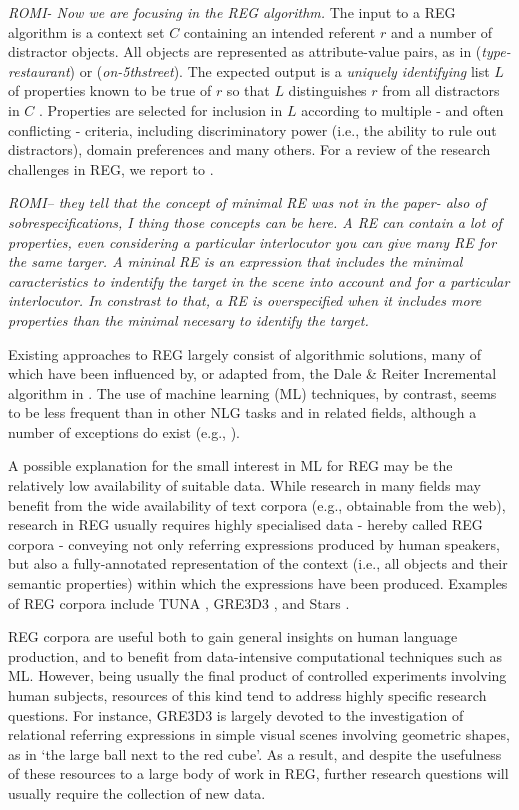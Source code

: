 \documentclass{article}
\begin{document}
{\it ROMI- Now we are focusing in the REG algorithm.} The input to a REG algorithm is a context set $C$ containing an intended referent $r$ and a number of distractor objects. All objects are represented as attribute-value pairs, as in ({\em type-restaurant}) or ({\em on-5thstreet}). The expected output is a {\em uniquely identifying} list $L$ of properties known to be true of $r$ so that $L$ distinguishes $r$ from all distractors in $C$ \cite{incremental}. Properties are selected for inclusion in $L$ according to multiple - and often conflicting - criteria, including discriminatory power (i.e., the ability to rule out distractors), domain preferences and many others. For a review of the research challenges in REG, we report to \cite{survey}.


{\it ROMI-- they tell that the concept of minimal RE was not in the paper- also of sobrespecifications, I thing those concepts can be here.
A RE can contain a lot of properties, even considering a particular interlocutor you can give many RE for the same targer. A mininal RE is an expression that includes the minimal caracteristics to indentify the target in the scene into account and for a particular interlocutor. In constrast to that, a RE is overspecified when it includes more properties than the minimal necesary to identify the target. }

Existing approaches to REG largely consist of algorithmic solutions, many of which have been influenced by, or adapted from, the Dale \& Reiter Incremental algorithm in \cite{incremental}. The use of machine learning (ML) techniques, by contrast, seems to be less frequent than in other NLG tasks and in related fields, although a number of exceptions do exist (e.g., \cite{jordan,speaker-dependent,viethen-phd,thiago-svm}). 

A possible explanation for the small interest in ML for REG may be the relatively low availability of suitable data. While research in many fields may benefit from the wide availability of text corpora (e.g., obtainable from the web), research in REG usually requires highly specialised data  - hereby called REG corpora - conveying not only referring expressions produced by human speakers, but also a fully-annotated representation of the context (i.e., all objects and their semantic properties) within which the expressions have been produced. Examples of REG corpora include TUNA \cite{tuna-corpus}, GRE3D3 \cite{gre3d3}, and Stars \cite{stars-mutual-disamb}. 

REG corpora are useful both to gain general insights on human  language production, and to benefit from data-intensive computational techniques such as ML. However, being usually the  final product of controlled  experiments involving human subjects, resources of this kind tend to address highly specific research questions. For instance, GRE3D3 is largely devoted to the investigation of relational referring expressions in simple visual scenes involving geometric shapes, as in `the large ball next to the red cube'. As a result, and despite the usefulness of these resources to a large body of work in REG, further research questions will usually require the collection of new data.
\end{document}
